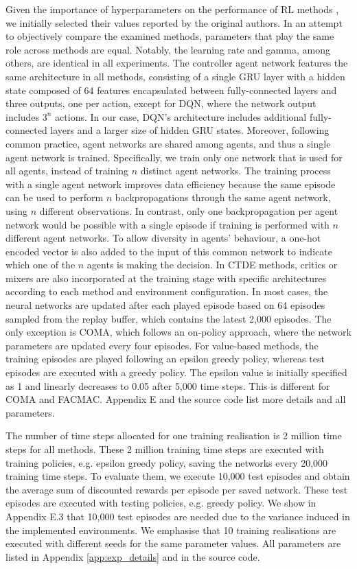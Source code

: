 Given the importance of hyperparameters on the performance of RL methods \citep{gorsane2022towards}, we initially selected their values reported by the original authors.
In an attempt to objectively compare the examined methods, parameters that play the same role across methods are equal.
Notably, the learning rate and gamma, among others, are identical in all experiments.
The controller agent network features the same architecture in all methods, consisting of a single GRU layer with a hidden state composed of 64 features encapsulated between fully-connected layers and three outputs, one per action, except for DQN, where the network output includes $3^n$ actions.
In our case, DQN's architecture includes additional fully-connected layers and a larger size of hidden GRU states.
Moreover, following common practice, agent networks are shared among agents, and thus a single agent network is trained.
Specifically, we train only one network that is used for all agents, instead of training $n$ distinct agent networks.
The training process with a single agent network improves data efficiency because the same episode can be used to perform $n$ backpropagations through the same agent network, using $n$ different observations.
In contrast, only one backpropagation per agent network would be possible with a single episode if training is performed with $n$ different agent networks.
To allow diversity in agents' behaviour, a one-hot encoded vector is also added to the input of this common network to indicate which one of the $n$ agents is making the decision.
In CTDE methods, critics or mixers are also incorporated at the training stage with specific architectures according to each method and environment configuration.
In most cases, the neural networks are updated after each played episode based on 64 episodes sampled from the replay buffer, which contains the latest 2,000 episodes.
The only exception is COMA, which follows an on-policy approach, where the network parameters are updated every four episodes.
For value-based methods, the training episodes are played following an epsilon greedy policy, whereas test episodes are executed with a greedy policy.
The epsilon value is initially specified as 1 and linearly decreases to 0.05 after 5,000 time steps.
This is different for COMA and FACMAC. 
Appendix E and the source code list more details and all parameters.

The number of time steps allocated for one training realisation is 2 million time steps for all methods.
These 2 million training time steps are executed with training policies, e.g. epsilon greedy policy, saving the networks every 20,000 training time steps.
To evaluate them, we execute 10,000 test episodes and obtain the average sum of discounted rewards per episode per saved network.
These test episodes are executed with testing policies, e.g. greedy policy.
We show in Appendix E.3 that 10,000 test episodes are needed due to the variance induced in the implemented environments.
We emphasise that 10 training realisations are executed with different seeds for the same parameter values.
All parameters are listed in Appendix \ref{app:exp_details} and in the source code.

